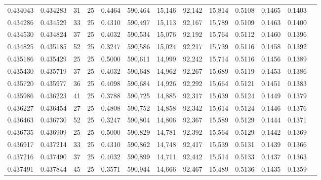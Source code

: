 \begin{tabular}{rrrrrrrrrrrrr}
0.434043 & 0.434283 &    31 &  25 &                                     0.4464 & 590,464 &  15,146 &  92,142 &  15,814 & 0.5108 & 0.1465 & 0.1403 \\
0.434286 & 0.434529 &    33 &  25 &                                     0.4310 & 590,497 &  15,113 &  92,167 &  15,789 & 0.5109 & 0.1463 & 0.1400 \\
0.434530 & 0.434824 &    37 &  25 &                                     0.4032 & 590,534 &  15,076 &  92,192 &  15,764 & 0.5112 & 0.1460 & 0.1396 \\
0.434825 & 0.435185 &    52 &  25 &                                     0.3247 & 590,586 &  15,024 &  92,217 &  15,739 & 0.5116 & 0.1458 & 0.1392 \\
0.435186 & 0.435429 &    25 &  25 &                                     0.5000 & 590,611 &  14,999 &  92,242 &  15,714 & 0.5116 & 0.1456 & 0.1389 \\
0.435430 & 0.435719 &    37 &  25 &                                     0.4032 & 590,648 &  14,962 &  92,267 &  15,689 & 0.5119 & 0.1453 & 0.1386 \\
0.435720 & 0.435977 &    36 &  25 &                                     0.4098 & 590,684 &  14,926 &  92,292 &  15,664 & 0.5121 & 0.1451 & 0.1383 \\
0.435986 & 0.436223 &    41 &  25 &                                     0.3788 & 590,725 &  14,885 &  92,317 &  15,639 & 0.5124 & 0.1449 & 0.1379 \\
0.436227 & 0.436454 &    27 &  25 &                                     0.4808 & 590,752 &  14,858 &  92,342 &  15,614 & 0.5124 & 0.1446 & 0.1376 \\
0.436463 & 0.436730 &    52 &  25 &                                     0.3247 & 590,804 &  14,806 &  92,367 &  15,589 & 0.5129 & 0.1444 & 0.1371 \\
0.436735 & 0.436909 &    25 &  25 &                                     0.5000 & 590,829 &  14,781 &  92,392 &  15,564 & 0.5129 & 0.1442 & 0.1369 \\
0.436917 & 0.437214 &    33 &  25 &                                     0.4310 & 590,862 &  14,748 &  92,417 &  15,539 & 0.5131 & 0.1439 & 0.1366 \\
0.437216 & 0.437490 &    37 &  25 &                                     0.4032 & 590,899 &  14,711 &  92,442 &  15,514 & 0.5133 & 0.1437 & 0.1363 \\
0.437491 & 0.437844 &    45 &  25 &                                     0.3571 & 590,944 &  14,666 &  92,467 &  15,489 & 0.5136 & 0.1435 & 0.1359 \\

\end{tabular}
